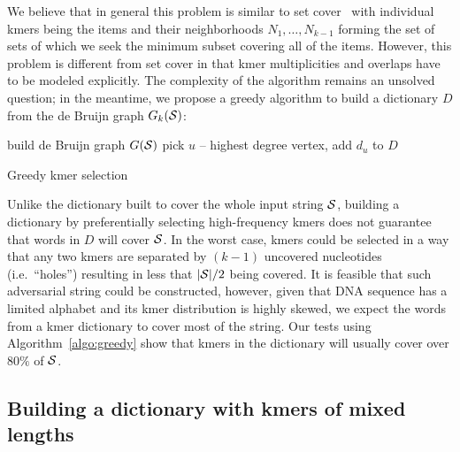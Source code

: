\documentclass[12pt]{cmuthesis}
\makeatletter
\newcommand{\ie}{i.e.\@}
\makeatother
\begin{document}

  We believe that in general this problem is similar to set cover~\cite{SetCoverIsHard} with individual kmers being the items and their neighborhoods $N_1, \ldots, N_{k-1}$ forming the set of sets of which we seek the minimum subset covering all of the items. However, this problem is different from set cover in that kmer multiplicities and overlaps have to be modeled explicitly. The complexity of the algorithm remains an unsolved question; in the meantime, we propose a greedy algorithm to build a dictionary $D$ from the de Bruijn graph $G_k(\mathcal{S})$:
  
  \begin{algorithm}[H]
   build de Bruijn graph $G(\mathcal{S})$\;
   pick $u$ -- highest degree vertex, add $d_u$ to $D$\;
   \caption{Greedy kmer selection}
   \label{algo:greedy}
  \end{algorithm}

  

  Unlike the dictionary built to cover the whole input string $\mathcal{S}$, building a dictionary by preferentially selecting high-frequency kmers does not guarantee that words in $D$ will cover $\mathcal{S}$. In the worst case, kmers could be selected in a way that any two kmers are separated by $(k-1)$ uncovered nucleotides (\ie~``holes'') resulting in less that $|\mathcal{S}| / 2$ being covered. It is feasible that such adversarial string could be constructed, however, given that DNA sequence has a limited alphabet and its kmer distribution is highly skewed, we expect the words from a kmer dictionary to cover most of the string. Our tests using Algorithm~\ref{algo:greedy} show that kmers in the dictionary will usually cover over $80\%$ of $\mathcal{S}$.

  \subsection{Building a dictionary with kmers of mixed lengths}
\end{document}
